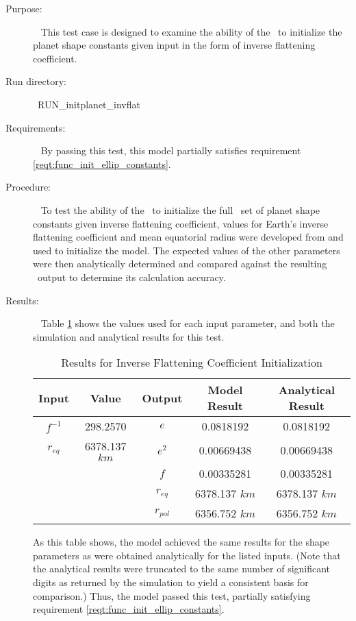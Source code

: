\label{test:init_invflat}
\begin{description}
\item[Purpose:]\ \newline
This test case is designed to examine the ability of the \planetDesc\ to
initialize the planet shape constants given input in the form of inverse
flattening coefficient.
\item[Run directory:]\ \newline RUN\_initplanet\_invflat
\item[Requirements:]\ \newline
By passing this test, this model partially satisfies requirement
\mbox{\ref{reqt:func_init_ellip_constants}}.

\item[Procedure:]\ \newline
To test the ability of the \planetDesc\ to initialize the full \JEODid\ set of
planet shape constants given inverse flattening coefficient, values for Earth's
inverse flattening coefficient and mean equatorial radius were developed from
\cite{ValladoSecond} and used to initialize the model.  The expected values of
the other parameters were then analytically determined and compared against the
resulting \planetDesc\ output to determine its calculation accuracy.

\item[Results:]\ \newline
Table \ref{invflat_init_table} shows the values used for each input parameter,
and both the simulation and analytical results for this test.

\begin{table}[ht]
\begin{center}
\begin{tabular}{|c|c|c|c|c|}\hline
 Input & Value & Output & Model Result & Analytical Result \\ \hline
 $f^{-1}$ & 298.2570 & $e$ & 0.0818192 & 0.0818192 \\ \hline
 $r_{eq}$ & 6378.137 $km$ & $e^2$ & 0.00669438 & 0.00669438 \\ \hline
   &   & $f$ & 0.00335281 & 0.00335281 \\ \hline
   &   & $r_{eq}$ & 6378.137 $km$ & 6378.137 $km$ \\ \hline
   &   & $r_{pol}$ & 6356.752 $km$ & 6356.752 $km$ \\ \hline
\end{tabular}
\caption{Results for Inverse Flattening Coefficient Initialization}
\label{invflat_init_table}
\end{center}
\end{table}

As this table shows, the model achieved the same results for the shape
parameters as were obtained analytically for the listed inputs. (Note that the
analytical results were truncated to the same number of significant digits as
returned by the simulation to yield a consistent basis for comparison.) Thus,
the model passed this test, partially satisfying requirement
\mbox{\ref{reqt:func_init_ellip_constants}}.
\end{description}


